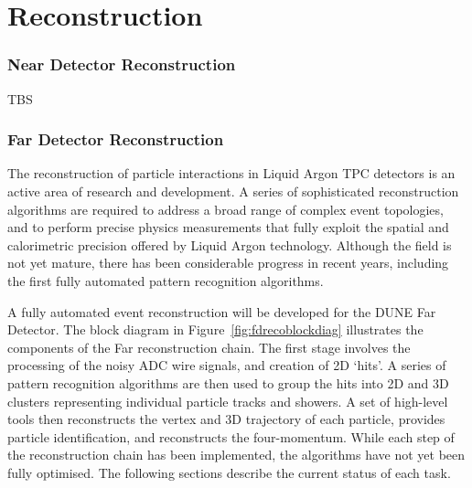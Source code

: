 \chapter{Reconstruction}
\label{annex:detectors-sc-physics-software-reconstruction}

\subsection{Near Detector Reconstruction}
\label{annex:detectors-sc-physics-software-reconstruction-nd}

TBS

\subsection{Far Detector Reconstruction}
\label{annex:detectors-sc-physics-software-reconstruction-fd}

The reconstruction of particle interactions in Liquid Argon TPC
detectors is an active area of research and development.
A series of sophisticated reconstruction algorithms are required to
address a broad range of complex event topologies, and to perform
precise physics measurements that fully exploit the spatial and 
calorimetric precision offered by Liquid Argon technology.
Although the field is not yet mature, there has been considerable
progress in recent years, including the first fully automated
pattern recognition algorithms. 

A fully automated event reconstruction will be developed for the
DUNE Far Detector. The block diagram in Figure~\ref{fig:fdrecoblockdiag}
illustrates the components of the Far reconstruction chain. 
The first stage involves the processing of the noisy ADC wire signals,
and creation of 2D `hits'. A series of pattern recognition algorithms
are then used to group the hits into 2D and 3D clusters representing 
individual particle tracks and showers. A set of high-level tools
then reconstructs the vertex and 3D trajectory of each particle,
provides particle identification, and reconstructs the four-momentum.
While each step of the reconstruction chain has been implemented,
the algorithms have not yet been fully optimised.
The following sections describe the current status of each task.


